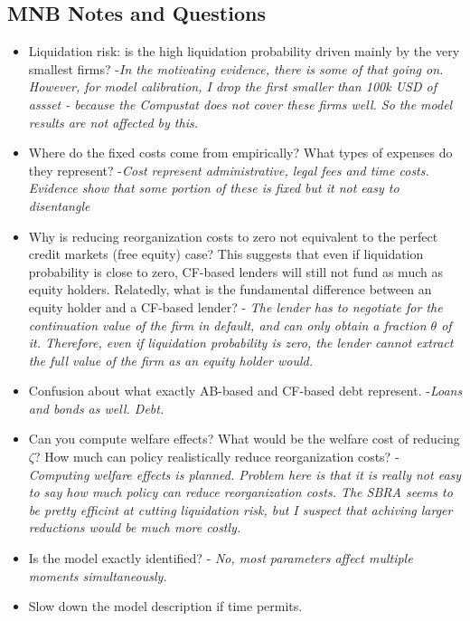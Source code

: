 \documentclass[12pt]{article}
\begin{document}
\subsection*{MNB Notes and Questions}
\begin{itemize} \setlength\itemsep{0em}  \small
    \item Liquidation risk: is the high liquidation probability driven mainly by the very smallest firms? -\textit{In the motivating evidence, there is some of that going on. However, for model calibration, I drop the first smaller than 100k USD of assset - because the Compustat does not cover these firms well. So the model results are not affected by this.}
    \item Where do the fixed costs come from empirically? What types of expenses do they represent? -\textit{Cost represent administrative, legal fees and time costs. Evidence show that some portion of these is fixed but it not easy to disentangle }
    \item Why is reducing reorganization costs to zero not equivalent to the perfect credit markets (free equity) case? This suggests that even if liquidation probability is close to zero, CF-based lenders will still not fund as much as equity holders. Relatedly, what is the fundamental difference between an equity holder and a CF-based lender? - \textit{The lender has to negotiate for the continuation value of the firm in default, and can only obtain a fraction $\theta$ of it. Therefore, even if liquidation probability is zero, the lender cannot extract the full value of the firm as an equity holder would.}
    \item Confusion about what exactly AB-based and CF-based debt represent. -\textit{Loans and bonds as well. Debt.}
    \item Can you compute welfare effects? What would be the welfare cost of reducing $\zeta$? How much can policy realistically reduce reorganization costs? - \textit{Computing welfare effects is planned. Problem here is that it is really not easy to say how much policy can reduce reorganization costs. The SBRA seems to be pretty efficint at cutting liquidation risk, but I suspect that achiving larger reductions would be much more costly.} 
    \item Is the model exactly identified? - \textit{No, most parameters affect multiple moments simultaneously. }
    \item Slow down the model description if time permits.
\end{itemize}
\end{document}
